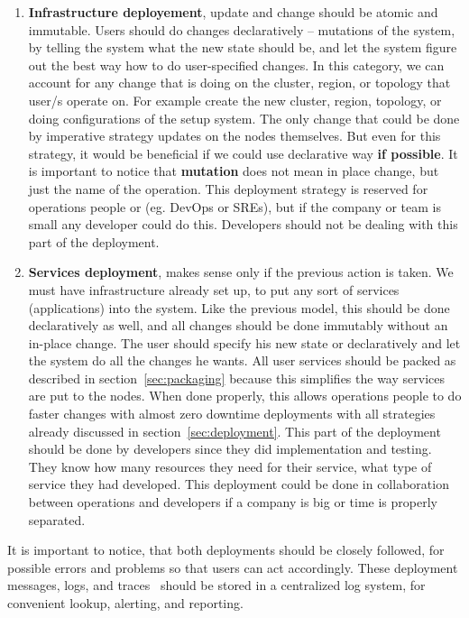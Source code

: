 \begin{enumerate}[start=1,label={(\bfseries \arabic*)}]
	\item \textbf{Infrastructure deployement}, update and change should be atomic and immutable. Users should do changes declaratively -- mutations of the system, by telling the system what the new state should be, and let the system figure out the best way how to do user-specified changes. In this category, we can account for any change that is doing on the cluster, region, or topology that user/s operate on. For example create the new cluster, region, topology, or doing configurations of the setup system. The only change that could be done by imperative strategy updates on the nodes themselves. But even for this strategy, it would be beneficial if we could use declarative way \textbf{if possible}. It is important to notice that \textbf{mutation} does not mean in place change, but just the name of the operation. This deployment strategy is reserved for operations people or (eg. DevOps or SREs), but if the company or team is small any developer could do this. Developers should not be dealing with this part of the deployment.
	\item \textbf{Services deployment}, makes sense only if the previous action is taken. We must have infrastructure already set up, to put any sort of services (applications) into the system. Like the previous model, this should be done declaratively as well, and all changes should be done immutably without an in-place change. The user should specify his new state or  declaratively and let the system do all the changes he wants. All user services should be packed as described in section~\ref{sec:packaging} because this simplifies the way services are put to the nodes. When done properly, this allows operations people to do faster changes with almost zero downtime deployments with all strategies already discussed in section~\ref{sec:deployment}. This part of the deployment should be done by developers since they did implementation and testing. They know how many resources they need for their service, what type of service they had developed. This deployment could be done in collaboration between operations and developers if a company is big or time is properly separated.
\end{enumerate}

\noindent
It is important to notice, that both deployments should be closely followed, for possible errors and problems so that users can act accordingly. These deployment messages, logs, and traces~\cite{36356} should be stored in a centralized log system, for convenient lookup, alerting, and reporting.

